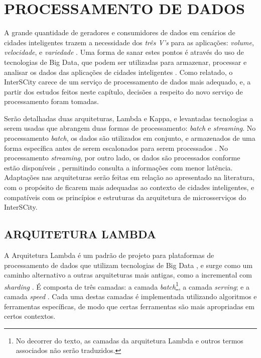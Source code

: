 \chapter[PROCESSAMENTO DE DADOS]{PROCESSAMENTO DE DADOS}
\label{chapter:data}

A grande quantidade de geradores e consumidores de dados em cenários de cidades
inteligentes trazem a necessidade dos \textit{três V's} para as aplicações:
\textit{volume}, \textit{velocidade}, e \textit{variedade} \cite{alnuaimi2015}.
Uma forma de sanar estes pontos é através do uso de tecnologias de Big Data,
que podem ser utilizadas para armazenar, processar e analisar os dados das
aplicações de cidades inteligentes \cite{alnuaimi2015}. Como relatado, o
InterSCity carece de um serviço de processamento de dados mais adequado, e,
a partir dos estudos feitos neste capítulo, decisões a respeito do novo
serviço de processamento foram tomadas.

Serão detalhadas duas arquiteturas, Lambda e Kappa, e levantadas tecnologias
a serem usadas que abrangem duas formas de processamento: \textit{batch} e
\textit{streaming}. No processamento \textit{batch}, os dados são utilizados
em conjunto, e armazenados de uma forma específica antes de serem escalonados
para serem processados \cite{zheng2015real}. No processamento
\textit{streaming}, por outro lado, os dados são processados conforme estão
disponíveis \cite{zheng2015real}, permitindo consulta a informações com menor
latência. Adaptações nas arquiteturas serão feitas em relação ao apresentado na
literatura, com o propósito de ficarem mais adequadas ao contexto de cidades
inteligentes, e compatíveis com os princípios e estruturas da arquitetura de
microsserviços do InterSCity.

\section{ARQUITETURA LAMBDA}

A Arquitetura Lambda é um padrão de projeto para plataformas de processamento
de dados que utilizam tecnologias de Big Data \cite{kiran2015}, e surge como um
caminho alternativo a outras arquiteturas mais antigas, como a incremental com
\textit{sharding} \cite{marz2015}. É composta de três camadas: a camada
\textit{batch}\footnote{No decorrer do texto, as camadas da arquitetura Lambda
e outros termos associados não serão traduzidos.}, a camada \textit{serving}; e
a camada \textit{speed} \cite{kiran2015}. Cada uma destas camadas é
implementada utilizando algoritmos e ferramentas específicas, de modo
que certas ferramentas são mais apropriadas em certos contextos.

